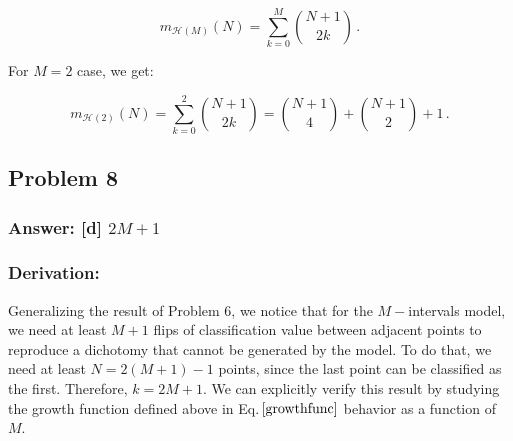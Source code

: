 \documentclass[11pt]{article}
\begin{document}
\[
\label{growthfunc}
m_{\mathcal{H}(M)}(N)=\sum^M_{k=0} {N+1\choose2 k}\,.
\]

For \(M=2\) case, we get:

\[
m_{\mathcal{H}(2)}(N)=\sum^2_{k=0} {N+1\choose2 k}={N+1\choose4}+{N+1\choose2}+1\,.
\]

    \hypertarget{problem-8}{%
\subsection{Problem 8}\label{problem-8}}

\hypertarget{answer-d-2m1}{%
\subsubsection{\texorpdfstring{Answer: {[}d{]}
\(2M+1\)}{Answer: {[}d{]} 2M+1}}\label{answer-d-2m1}}

\hypertarget{derivation}{%
\subsubsection{Derivation:}\label{derivation}}

Generalizing the result of Problem 6, we notice that for the
\(M-\)intervals model, we need at least \(M+1\) flips of classification
value between adjacent points to reproduce a dichotomy that cannot be
generated by the model. To do that, we need at least \(N=2(M+1)-1\)
points, since the last point can be classified as the first. Therefore,
\(k=2M+1\). We can explicitly verify this result by studying the growth
function defined above in Eq.\(\,\eqref{growthfunc}\) behavior as a
function of \(M\).
\end{document}
